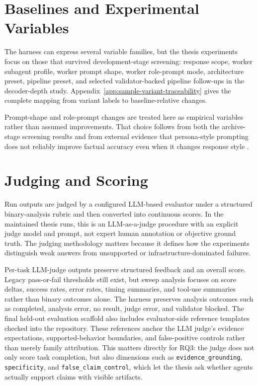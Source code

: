 \section{Baselines and Experimental Variables}

The harness can express several variable families, but the thesis experiments focus on those that survived development-stage screening: response scope, worker subagent profile, worker prompt shape, worker role-prompt mode, architecture preset, pipeline preset, and selected validator-backed pipeline follow-ups in the decoder-depth study. Appendix~\ref{app:sample-variant-traceability} gives the complete mapping from variant labels to baseline-relative changes.

Prompt-shape and role-prompt changes are treated here as empirical variables rather than assumed improvements. That choice follows from both the archive-stage screening results and from external evidence that persona-style prompting does not reliably improve factual accuracy even when it changes response style \cite{basil2025promptingscience4}.

\section{Judging and Scoring}

Run outputs are judged by a configured LLM-based evaluator under a structured binary-analysis rubric and then converted into continuous scores. In the maintained thesis runs, this is an LLM-as-a-judge procedure with an explicit judge model and prompt, not expert human annotation or objective ground truth. The judging methodology matters because it defines how the experiments distinguish weak answers from unsupported or infrastructure-dominated failures.

Per-task LLM-judge outputs preserve structured feedback and an overall score. Legacy pass-or-fail thresholds still exist, but sweep analysis focuses on score deltas, success rates, error rates, timing summaries, and tool-use summaries rather than binary outcomes alone. The harness preserves analysis outcomes such as completed, analysis error, no result, judge error, and validator blocked. The final held-out evaluation scaffold also includes evaluator-side reference templates checked into the repository. These references anchor the LLM judge's evidence expectations, supported-behavior boundaries, and false-positive controls rather than merely family attribution. This matters directly for RQ3: the judge does not only score task completion, but also dimensions such as \texttt{evidence\_grounding}, \texttt{specificity}, and \texttt{false\_claim\_control}, which let the thesis ask whether agents actually support claims with visible artifacts.

